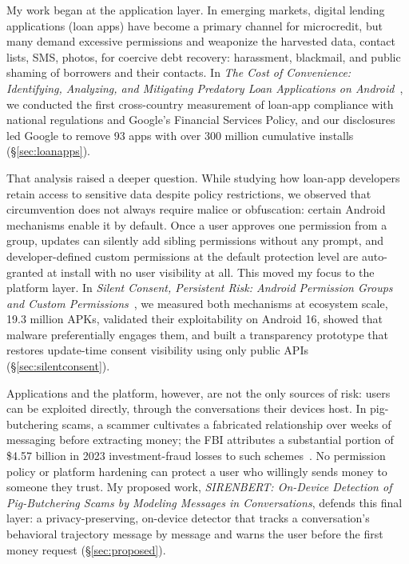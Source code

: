 \documentclass[letterpaper,11pt]{article}
\begin{document}
My work began at the application layer. In emerging markets, digital
lending applications (loan apps) have become a primary channel for
microcredit, but many demand excessive permissions and weaponize the
harvested data, contact lists, SMS, photos, for coercive debt
recovery: harassment, blackmail, and public shaming of borrowers and
their contacts. In \emph{The Cost of Convenience: Identifying,
Analyzing, and Mitigating Predatory Loan Applications on
Android}~\cite{akanji2026cost}, we conducted the first cross-country
measurement of loan-app compliance with national regulations and
Google's Financial Services Policy, and our disclosures led Google to
remove 93 apps with over 300 million cumulative installs
(\S\ref{sec:loanapps}).

That analysis raised a deeper question. While studying how loan-app
developers retain access to sensitive data despite policy
restrictions, we observed that circumvention does not always require
malice or obfuscation: certain Android mechanisms enable it by
default. Once a user approves one permission from a group, updates can
silently add sibling permissions without any prompt, and developer-defined
custom permissions at the default protection level are auto-granted at
install with no user visibility at all. This moved my focus to the
platform layer. In \emph{Silent Consent, Persistent Risk: Android
Permission Groups and Custom Permissions}~\cite{akanji2026silent}, we
measured both mechanisms at ecosystem scale, 19.3 million APKs,
validated their exploitability on Android 16, showed that malware
preferentially engages them, and built a transparency prototype that
restores update-time consent visibility using only public APIs
(\S\ref{sec:silentconsent}).

Applications and the platform, however, are not the only sources of
risk: users can be exploited directly, through the conversations their
devices host. In pig-butchering scams, a scammer cultivates a
fabricated relationship over weeks of messaging before extracting
money; the FBI attributes a substantial portion of \$4.57 billion in
2023 investment-fraud losses to such schemes~\cite{ic32023}. No
permission policy or platform hardening can protect a user who
willingly sends money to someone they trust. My proposed work,
\emph{SIRENBERT: On-Device Detection of Pig-Butchering Scams by
Modeling Messages in Conversations}, defends this final layer: a
privacy-preserving, on-device detector that tracks a conversation's
behavioral trajectory message by message and warns the user before
the first money request (\S\ref{sec:proposed}).
\end{document}
